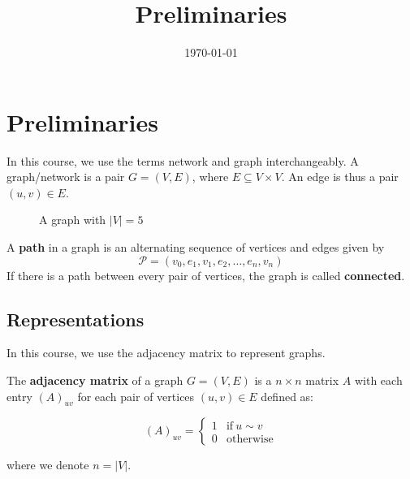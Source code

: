 \documentclass{article}
\title{Preliminaries}
\date{\today}
\begin{document}
\maketitle

\section{Preliminaries}
In this course, we use the terms network and graph interchangeably. A graph/network is a pair $G=(V, E)$, where $E \subseteq V \times V$. An edge is thus a pair $(u,v) \in E$. 

\begin{figure}[H]
    \centering
    \caption{A graph with $|V|=5$}
    \label{fig: example graph}
\end{figure}

\begin{definition}
    A \textbf{path} in a graph is an alternating sequence of vertices and edges given by 
    \[
    \mathcal{P} = (v_0, e_1, v_1, e_2, \ldots, e_n,v_n)
    \]
    If there is a path between every pair of vertices, the graph is called \textbf{connected}. 
\end{definition}

\subsection{Representations} 

In this course, we use the adjacency matrix to represent graphs.  

\begin{definition}
    The \textbf{adjacency matrix} of a graph $G=(V,E)$ is a $n\times n$ matrix $A$ with each entry $(A)_{uv}$ for each pair of vertices $(u,v)\in E$ defined as:
    \begin{singlespace}
        \begin{equation*}
         (A)_{uv} = \begin{cases}
            1 & \mathrm{if} \ u\sim v \\
            0 & \mathrm{otherwise}
        \end{cases}
    \end{equation*}
    \end{singlespace}
    where we denote $n=|V|$.
\end{definition}  
\end{document}
